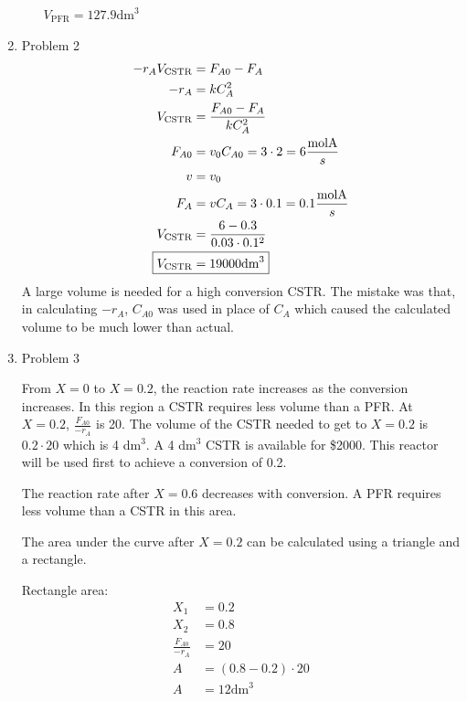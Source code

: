 \documentclass[12pt]{article}
\begin{document}
\begin{enumerate}
\begin{enumerate}
        $\boxed{V_{\mathrm{PFR}} = 127.9 \mathrm{dm}^3}$
    \end{enumerate}

\newpage
    \item Problem 2
    \begin{align*}
        -r_A V_{\mathrm{CSTR}} &= F_{A0} - F_A \\
        -r_A &= k C_A^2 \\
         V_{\mathrm{CSTR}} &= \frac{F_{A0} - F_A}{k C_A^2} \\
         F_{A0} &= v_0 C_{A0} = 3 \cdot 2 = 6 \frac{\mathrm{molA}}{s} \\
         v &= v_0 \\
         F_A &= v C_A = 3 \cdot 0.1 = 0.1 \frac{\mathrm{molA}}{s} \\
         V_{\mathrm{CSTR}} &= \frac{6 - 0.3}{0.03 \cdot 0.1^2} \\
         \Aboxed{V_{\mathrm{CSTR}} &= 19000 \mathrm{dm}^3}
    \end{align*}
    A large volume is needed for a high conversion CSTR. The mistake was that, in calculating $-r_A$, $C_{A0}$ was used in place of $C_A$ which caused the calculated volume to be much lower than actual.

\newpage
    \item Problem 3

    From $X=0$ to $X=0.2$, the reaction rate increases as the conversion increases. In this region a CSTR requires less volume than a PFR. At $X=0.2$, $\frac{F_{A0}}{-r_A}$ is 20. The volume of the CSTR needed to get to $X=0.2$ is $0.2 \cdot 20$ which is 4 dm$^3$. A 4 dm$^3$ CSTR is available for \$2000. This reactor will be used first to achieve a conversion of 0.2.

    The reaction rate after $X=0.6$ decreases with conversion. A PFR requires less volume than a CSTR in this area.

    The area under the curve after $X=0.2$ can be calculated using a triangle and a rectangle. 

    Rectangle area:
    \begin{align*}
        X_1 &= 0.2 \\
        X_2 &= 0.8 \\
        \frac{F_{A0}}{-r_A} &= 20 \\
        A &= (0.8 - 0.2) \cdot 20 \\
        A &= 12 \mathrm{dm}^3
    \end{align*}


\end{enumerate}
\end{document}
